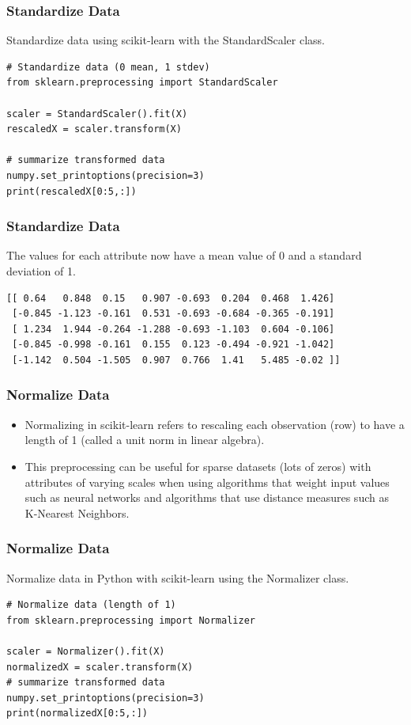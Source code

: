 \begin{frame}[fragile]\frametitle{Standardize Data}
Standardize data using scikit-learn with the StandardScaler class.
\begin{lstlisting}
# Standardize data (0 mean, 1 stdev)
from sklearn.preprocessing import StandardScaler

scaler = StandardScaler().fit(X)
rescaledX = scaler.transform(X)

# summarize transformed data
numpy.set_printoptions(precision=3)
print(rescaledX[0:5,:])
\end{lstlisting}
\end{frame}

\begin{frame}[fragile]\frametitle{Standardize Data}
The values for each attribute now have a mean value of 0 and a standard deviation of 1.
\begin{lstlisting}
[[ 0.64   0.848  0.15   0.907 -0.693  0.204  0.468  1.426]
 [-0.845 -1.123 -0.161  0.531 -0.693 -0.684 -0.365 -0.191]
 [ 1.234  1.944 -0.264 -1.288 -0.693 -1.103  0.604 -0.106]
 [-0.845 -0.998 -0.161  0.155  0.123 -0.494 -0.921 -1.042]
 [-1.142  0.504 -1.505  0.907  0.766  1.41   5.485 -0.02 ]]
\end{lstlisting}
\end{frame}




\begin{frame}[fragile]\frametitle{Normalize Data}

	\begin{itemize}
	\item Normalizing in scikit-learn refers to rescaling each observation (row) to have a length of 1 (called a unit norm in linear algebra).
	\item This preprocessing can be useful for sparse datasets (lots of zeros) with attributes of varying scales when using algorithms that weight input values such as neural networks and algorithms that use distance measures such as K-Nearest Neighbors.
	\end{itemize}
	
\end{frame}

\begin{frame}[fragile]\frametitle{Normalize Data}
Normalize data in Python with scikit-learn using the Normalizer class.
 \begin{lstlisting}
# Normalize data (length of 1)
from sklearn.preprocessing import Normalizer

scaler = Normalizer().fit(X)
normalizedX = scaler.transform(X)
# summarize transformed data
numpy.set_printoptions(precision=3)
print(normalizedX[0:5,:])
\end{lstlisting}
\end{frame}

